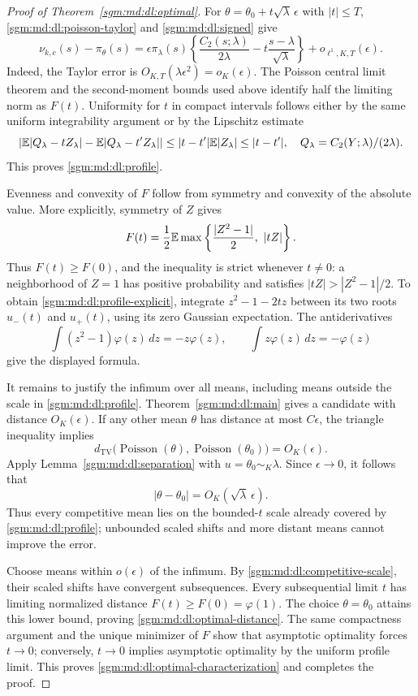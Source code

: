 \documentclass[11pt,letterpaper]{article}
\theoremstyle{remark}\newtheorem{remark}[theorem]{Remark}
\newcommand{\Poi}{\operatorname{Poisson}}\newcommand{\Bin}{\operatorname{Bin}}
\theoremstyle{definition}\newtheorem{definition}[theorem]{Definition}
\newcommand{\TV}{d_{\mathrm{TV}}}
\begin{document}
\begin{proof}[Proof of Theorem~\ref{sgm:md:dl:optimal}]
For $\theta=\theta_0+t\sqrt\lambda\,\epsilon$ with $|t|\le T$,
\eqref{sgm:md:dl:poisson-taylor} and \eqref{sgm:md:dl:signed} give
\begin{equation}\label{sgm:md:dl:profile-signed}
 \nu_{k,c}(s)-\pi_\theta(s)
 =\epsilon\pi_\lambda(s)
   \left\{\frac{C_2(s;\lambda)}{2\lambda}
                       -t\frac{s-\lambda}{\sqrt\lambda}\right\}
       +o_{\ell^1,K,T}(\epsilon).
\end{equation}
Indeed, the Taylor error is
$O_{K,T}(\lambda\epsilon^2)=o_K(\epsilon)$.
The Poisson central limit theorem and the second-moment bounds used
above identify half the limiting norm as $F(t)$.
Uniformity for $t$ in compact intervals follows either by the same
uniform integrability argument or by the Lipschitz estimate
\[
 \left|\mathbb E|Q_\lambda-tZ_\lambda|
       -\mathbb E|Q_\lambda-t'Z_\lambda|\right|
 \le |t-t'|\mathbb E|Z_\lambda|\le |t-t'|,
 \quad Q_\lambda=C_2(Y;\lambda)/(2\lambda).
\]
This proves \eqref{sgm:md:dl:profile}.

Evenness and convexity of $F$ follow from symmetry and convexity of the
absolute value.  More explicitly, symmetry of $Z$ gives
\[
 F(t)=\frac12\mathbb E\max\left\{
                      \frac{|Z^2-1|}{2},\ |tZ|\right\}.
\]
Thus $F(t)\ge F(0)$, and the inequality is strict whenever $t\ne0$:
a neighborhood of $Z=1$ has positive probability and satisfies
$|tZ|>|Z^2-1|/2$.
To obtain \eqref{sgm:md:dl:profile-explicit}, integrate
$z^2-1-2tz$ between its two roots $u_-(t)$ and $u_+(t)$,
using its zero Gaussian expectation.  The antiderivatives
\[
 \int(z^2-1)\varphi(z)\,dz=-z\varphi(z),\qquad
 \int z\varphi(z)\,dz=-\varphi(z)
\]
give the displayed formula.

It remains to justify the infimum over all means, including means
outside the scale in \eqref{sgm:md:dl:profile}.
Theorem~\ref{sgm:md:dl:main} gives a candidate with distance $O_K(\epsilon)$.
If any other mean $\theta$ has distance at most $C\epsilon$, the triangle
inequality implies
\[
 \TV\bigl(\Poi(\theta),\Poi(\theta_0)\bigr)=O_K(\epsilon).
\]
Apply Lemma~\ref{sgm:md:dl:separation} with $u=\theta_0\sim_K\lambda$.
Since $\epsilon\to0$, it follows that
\begin{equation}\label{sgm:md:dl:competitive-scale}
 |\theta-\theta_0|=O_K(\sqrt\lambda\,\epsilon).
\end{equation}
Thus every competitive mean lies on the bounded-$t$ scale already
covered by \eqref{sgm:md:dl:profile}; unbounded scaled shifts and more distant
means cannot improve the error.

Choose means within $o(\epsilon)$ of the infimum.  By
\eqref{sgm:md:dl:competitive-scale}, their scaled shifts have convergent
subsequences.  Every subsequential limit $t$ has limiting normalized
distance $F(t)\ge F(0)=\varphi(1)$.
The choice $\theta=\theta_0$ attains this lower bound, proving
\eqref{sgm:md:dl:optimal-distance}.  The same compactness argument and the
unique minimizer of $F$ show that asymptotic optimality forces $t\to0$;
conversely, $t\to0$ implies asymptotic optimality by the uniform profile
limit.  This proves \eqref{sgm:md:dl:optimal-characterization} and completes
the proof.
\end{proof}
\end{document}
